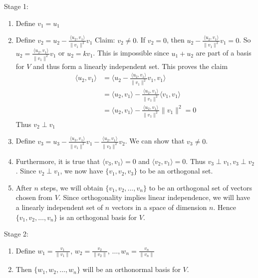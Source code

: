 \documentclass[12pt]{article}
\begin{document}
Stage 1: \begin{enumerate} \item Define $v_1 = u_1$ \item Define $v_2 = u_2 - \frac{\langle u_2, v_1\rangle}{\|v_1\|^2}v_1 $ \newline Claim: $v_2 \neq 0$. If $v_2 = 0$, then $u_2 - \frac{\langle u_2, v_1\rangle}{\|v_1\|^2}v_1 = 0$. So $u_2 = \frac{\langle u_2, v_1\rangle}{\|v_1\|^2}v_1$ or $u_2 = kv_1$. This is impossible since $u_1 + u_2$ are part of a basis for $V$ and thus form a linearly independent set. This proves the claim $$\begin{aligned} \langle u_2, v_1 \rangle &= \langle u_2 - \frac{\langle u_2, v_1\rangle}{\|v_1\|^2}v_1, v_1 \rangle \\ &= \langle u_2, v_1 \rangle - \frac{\langle u_2, v_1\rangle}{\|v_1\|^2}\langle v_1, v_1 \rangle \\ &= \langle u_2, v_1 \rangle - \frac{\langle u_2, v_1\rangle}{\|v_1\|^2}\|v_1\|^2 = 0 \end{aligned} $$ Thus $v_2 \perp v_1$ 
\item Define $v_3 = u_3 - \frac{\langle u_3, v_1 \rangle}{\|v_1\|^2}v_1 - \frac{\langle u_2, v_1 \rangle}{\|v_2\|^2}v_2$. \newline We can show that $v_3 \neq 0$. 
\item Furthermore, it is true that $\langle v_3, v_1 \rangle = 0$ and $\langle v_2, v_1 \rangle = 0$. Thus $v_3 \perp v_1, v_3 \perp v_2$. Since $v_2 \perp v_1$, we now have $\{v_1, v_2, v_3\}$ to be an orthogonal set.
 \item After $n$ steps, we will obtain $\{v_1, v_2, \dots, v_n\}$ to be an orthogonal set of vectors chosen from $V$. Since orthogonality implies linear independence, we will have a linearly independent set of $n$ vectors in a space of dimension $n$. Hence $\{v_1, v_2, \dots, v_n\}$ is an orthogonal basis for $V$. \end{enumerate} 
 Stage 2: \begin{enumerate} \item Define $w_1 = \frac{v_1}{\|v_1\|}$, $w_2 = \frac{v_2}{\|v_2\|}$, $\dots, w_n = \frac{v_n}{\|v_n\|}$ 
 \item Then $\{w_1, w_2, \dots, w_n\}$ will be an orthonormal basis for $V$. \end{enumerate} 
\end{document}
